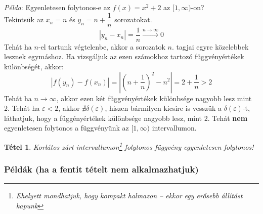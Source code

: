 \documentclass[a4paper,12pt,twoside]{book}
\newtheorem{tetel}{Tétel}[chapter]
\theoremstyle{break}
\theoremstyle{plain}
\begin{document}
\emph{Példa}: Egyenletesen folytonos-e az $f(x)=x^2+2$ az $[1,\infty)$-on?\\
Tekintsük az $x_n = n$ és $y_n = n+\dfrac{1}{n}$ sorozatokat.
\[|y_n-x_n| = \frac{1}{n} \xrightarrow{n\to\infty} 0\]
Tehát ha $n$-el tartunk végtelenbe, akkor a sorozatok $n$. tagjai egyre közelebbek lesznek egymáshoz. Ha vizsgáljuk az ezen számokhoz tartozó függvényértékek különbségét, akkor:
\[|f(y_n)-f(x_n)| = \left|\left(n+\frac{1}{n}\right)^2-n^2\right| = 2+\frac{1}{n} > 2\]
Tehát ha $n\to\infty$, akkor ezen két függvényértékek különbsége nagyobb lesz mint 2. Tehát ha $\varepsilon < 2$, akkor $\nexists \delta(\varepsilon)$, hiszen bármilyen kicsire is vesszük a $\delta(\varepsilon)$-t, láthatjuk, hogy a függényértékek különbsége nagyobb lesz, mint 2. Tehát \textbf{nem} egyenletesen folytonos a függvényünk az $[1, \infty)$ intervallumon.

\begin{tetel}
 Korlátos zárt intervallumon\footnote{Ehelyett mondhatjuk, hogy \emph{kompakt halmazon} -- ekkor egy erősebb állítást kapunk} folytonos függvény egyenletesen folytonos!
\end{tetel}
\addtocounter{biz}{1}

\subsubsection{Példák (ha a fentit tételt nem alkalmazhatjuk)}
\end{document}
